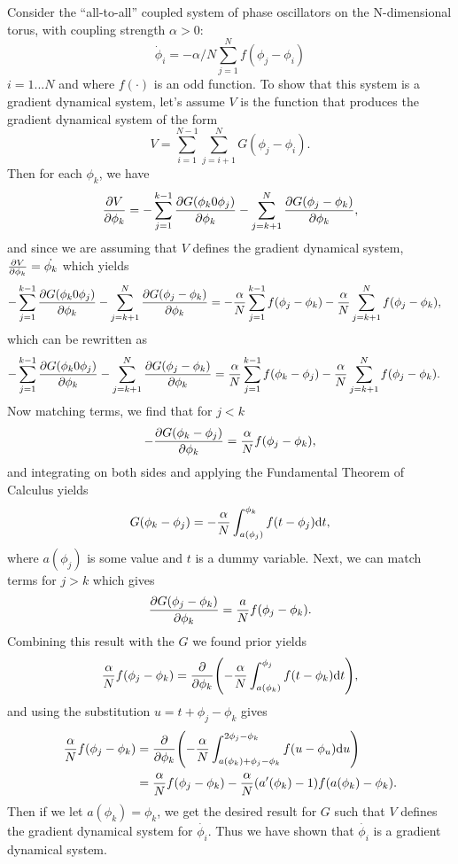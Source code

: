 \documentclass[12pt]{report}
\begin{document}
\begin{solution}

    \noindent
    Consider the ``all-to-all'' coupled system of phase oscillators on the N-dimensional torus, with coupling strength $\alpha>0$:
    \begin{equation*}
   \dot \phi_i = - \alpha/N \sum_{j=1}^N f(\phi_j - \phi_i)  
   \end{equation*}
   $i=1...N$ and where $f(\cdot)$ is an odd function. To show that this system is a gradient dynamical system, let's assume $V$ is the function that produces the gradient dynamical system of the form
   \[
        V = \sum_{i=1}^{N-1} \sum_{j=i+1}^{N} G(\phi_j - \phi_i).
   \]
   Then for each $\phi_k$, we have 
   \[
        \frac{\partial V}{\partial \phi_k} = - \sum_{j=1}^{k-1} \frac{\partial G(\phi_k 0 \phi_j)}{\partial \phi_k} - \sum_{j=k+1}^{N}\frac{\partial G(\phi_j - \phi_k)}{\partial \phi_k},
   \]
   and since we are assuming that $V$ defines the gradient dynamical system, $\frac{\partial V}{\partial \phi_k} = \dot{\phi_k}$ which yields
   \begin{align*}
    - \sum_{j=1}^{k-1} \frac{\partial G(\phi_k 0 \phi_j)}{\partial \phi_k} - \sum_{j=k+1}^{N}\frac{\partial G(\phi_j - \phi_k)}{\partial \phi_k} &= - \frac{\alpha}{N}\sum_{j=1}^{k-1}f(\phi_j - \phi_k) - \frac{\alpha}{N} \sum^{N}_{j=k+1}f(\phi_j - \phi_k),
   \end{align*}
   which can be rewritten as
   \begin{align*}
    - \sum_{j=1}^{k-1} \frac{\partial G(\phi_k 0 \phi_j)}{\partial \phi_k} - \sum_{j=k+1}^{N}\frac{\partial G(\phi_j - \phi_k)}{\partial \phi_k} &= \frac{\alpha}{N}\sum_{j=1}^{k-1}f(\phi_k - \phi_j) - \frac{\alpha}{N} \sum^{N}_{j=k+1}f(\phi_j - \phi_k).
   \end{align*}
   Now matching terms, we find that for $j<k$
   \[
        -\frac{\partial G(\phi_k - \phi_j)}{\partial \phi_k} = \frac{\alpha}{N}f(\phi_j - \phi_k),
   \]
   and integrating on both sides and applying the Fundamental Theorem of Calculus yields
   \[
        G(\phi_k - \phi_j) = - \frac{\alpha}{N} \int_{a(\phi_j)}^{\phi_k}f(t - \phi_j){\mathrm{d}} t,
   \]
   where $a(\phi_j)$ is some value and $t$ is a dummy variable. Next, we can match terms for $j>k$ which gives
   \[
        \frac{\partial G(\phi_j - \phi_k)}{\partial \phi_k} = \frac{a}{N}f(\phi_j - \phi_k).
   \]
   Combining this result with the $G$ we found prior yields
   \[
    \frac{\alpha}{N}f(\phi_j - \phi_k) = \frac{\partial }{\partial \phi_k}{\left(- \frac{\alpha}{N} \int_{a(\phi_k)}^{\phi_j}f(t - \phi_k){\mathrm{d}} t\right)},
   \]
   and using the substitution $u=t + \phi_j - \phi_k$ gives
   \begin{align*}
    \frac{\alpha}{N}f(\phi_j - \phi_k) &= \frac{\partial }{\partial \phi_k}{\left(- \frac{\alpha}{N} \int_{a(\phi_k) + \phi_j - \phi_k}^{2\phi_j - \phi_k}f(u - \phi_u){\mathrm{d}} u\right)}\\
    &=\frac{\alpha}{N}f(\phi_j - \phi_k) - \frac{\alpha}{N}(a'(\phi_k) - 1)f(a(\phi_k) - \phi_k).
   \end{align*}
   Then if we let $a(\phi_k) = \phi_k$, we get the desired result for $G$ such that $V$ defines the gradient dynamical system for $\dot{\phi_i}$. Thus we have shown that $\dot{\phi_i}$ is a gradient dynamical system.


\end{solution}
\end{document}
